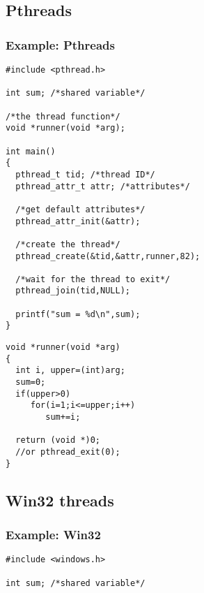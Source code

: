 \documentclass[CJKutf8,dvipsnames,table]{beamer}
\begin{document}
\begin{CJK*}{UTF8}{song}
  \subsection{Pthreads}

  \begin{frame}[fragile]
  \frametitle{Example: Pthreads} \pause
  \begin{minipage}[c]{0.6\textwidth}

\begin{lstlisting}
#include <pthread.h>

int sum; /*shared variable*/

/*the thread function*/
void *runner(void *arg);

int main()
{
  pthread_t tid; /*thread ID*/
  pthread_attr_t attr; /*attributes*/

  /*get default attributes*/
  pthread_attr_init(&attr);

  /*create the thread*/
  pthread_create(&tid,&attr,runner,82);

  /*wait for the thread to exit*/
  pthread_join(tid,NULL);

  printf("sum = %d\n",sum);
}
\end{lstlisting}

  \end{minipage}%
  \begin{minipage}[c]{0.4\textwidth}
\lstset{frame=single}
\begin{lstlisting}
void *runner(void *arg)
{
  int i, upper=(int)arg;
  sum=0;
  if(upper>0)
     for(i=1;i<=upper;i++)
        sum+=i;

  return (void *)0;
  //or pthread_exit(0);
}
\end{lstlisting}

  \end{minipage}
\end{frame}

  \subsection{Win32 threads}

  \begin{frame}[fragile]
  \frametitle{Example: Win32} \pause
  \begin{minipage}[c]{0.6\textwidth}

\begin{lstlisting}
#include <windows.h>

int sum; /*shared variable*/


\end{lstlisting}
\end{minipage}
\end{frame}
\end{CJK*}
\end{document}
